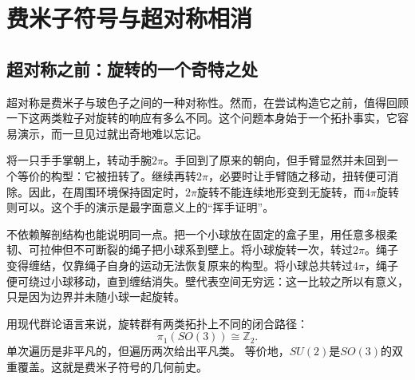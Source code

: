 \chapter{费米子符号与超对称相消}


\section{超对称之前：旋转的一个奇特之处}

超对称是费米子与玻色子之间的一种对称性。然而，在尝试构造它之前，值得回顾一下这两类粒子对旋转的响应有多么不同。这个问题本身始于一个拓扑事实，它容易演示，而一旦见过就出奇地难以忘记。

将一只手手掌朝上，转动手腕\(2\pi\)。手回到了原来的朝向，但手臂显然并未回到一个等价的构型：它被扭转了。继续再转\(2\pi\)，必要时让手臂随之移动，扭转便可消除。因此，在周围环境保持固定时，\(2\pi\)旋转不能连续地形变到无旋转，而\(4\pi\)旋转则可以。这个手的演示是最字面意义上的“挥手证明”。

不依赖解剖结构也能说明同一点。把一个小球放在固定的盒子里，用任意多根柔韧、可拉伸但不可断裂的绳子把小球系到壁上。将小球旋转一次，转过\(2\pi\)。绳子变得缠结，仅靠绳子自身的运动无法恢复原来的构型。将小球总共转过\(4\pi\)，绳子便可绕过小球移动，直到缠结消失。壁代表空间无穷远：这一比较之所以有意义，只是因为边界并未随小球一起旋转。

\begin{classroomqa}
\end{classroomqa}

\begin{classroomqa}
\end{classroomqa}

用现代群论语言来说，旋转群有两类拓扑上不同的闭合路径：
\begin{equation}
\pi_1\!\left(SO(3)\right)\cong \mathbb Z_2.
\end{equation}
单次遍历是非平凡的，但遍历两次给出平凡类。
等价地，\(SU(2)\)是\(SO(3)\)的双重覆盖。这就是费米子符号的几何前史。

